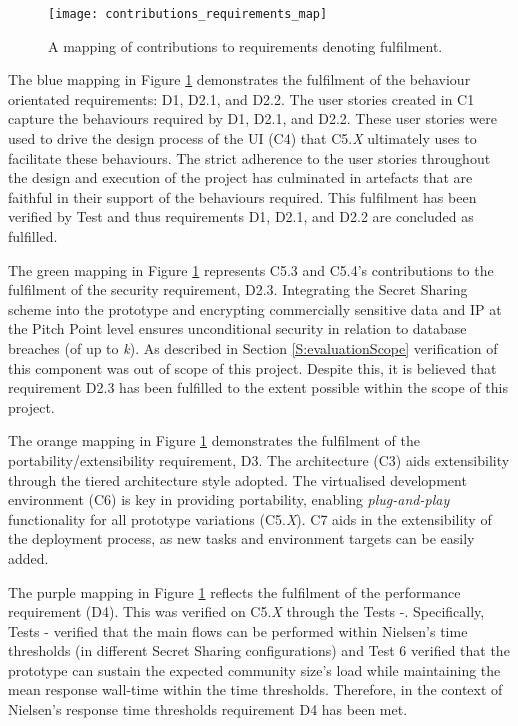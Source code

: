 \begin{figure}[ht]
    \centering
    \texttt{[image: contributions\_requirements\_map]}
    \caption{A mapping of contributions to requirements denoting fulfilment.}
    \label{fig:contribution_requirements_mapping}
\end{figure}

The blue mapping in Figure \ref{fig:contribution_requirements_mapping} demonstrates the fulfilment of the behaviour orientated requirements: D1, D2.1, and D2.2. The user stories created in C1 capture the behaviours required by D1, D2.1, and D2.2. These user stories were used to drive the design process of the UI (C4) that C5.{\em X} ultimately uses to facilitate these behaviours. The strict adherence to the user stories throughout the design and execution of the project has culminated in artefacts that are faithful in their support of the behaviours required. This fulfilment has been verified by Test  and thus requirements D1, D2.1, and D2.2 are concluded as fulfilled.

The green mapping in Figure \ref{fig:contribution_requirements_mapping} represents C5.3 and C5.4's contributions to the fulfilment of the security requirement, D2.3. Integrating the Secret Sharing scheme into the prototype and encrypting commercially sensitive data and IP at the Pitch Point level ensures unconditional security in relation to database breaches (of up to \textit{k}). As described in Section \ref{S:evaluationScope} verification of this component was out of scope of this project. Despite this, it is believed that requirement D2.3 has been fulfilled to the extent possible within the scope of this project.

The orange mapping in Figure \ref{fig:contribution_requirements_mapping} demonstrates the fulfilment of the portability/extensibility requirement, D3. The architecture (C3) aids extensibility through the tiered architecture style adopted. The virtualised development environment (C6) is key in providing portability, enabling \textit{plug-and-play} functionality for all prototype variations (C5.{\em X}). C7 aids in the extensibility of the deployment process, as new tasks and environment targets can be easily added.

The purple mapping in Figure \ref{fig:contribution_requirements_mapping} reflects the fulfilment of the performance requirement (D4). This was verified on C5.{\em X} through the Tests -. Specifically, Tests - verified that the main flows can be performed within Nielsen's time thresholds (in different Secret Sharing configurations) and Test 6 verified that the prototype can sustain the expected community size's load while maintaining the mean response wall-time within the time thresholds. Therefore, in the context of Nielsen's response time thresholds requirement D4 has been met.

